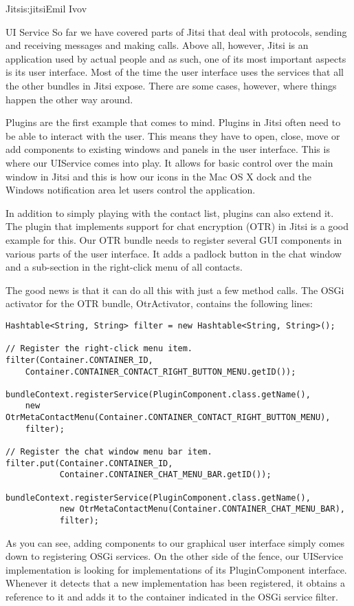 \begin{aosachapter}{Jitsi}{s:jitsi}{Emil Ivov}
\begin{aosasect1}{UI Service}
So far we have covered parts of Jitsi that deal with protocols,
sending and receiving messages and making calls. Above all, however,
Jitsi is an application used by actual people and as such, one of its
most important aspects is its user interface. Most of the time the
user interface uses the services that all the other bundles in Jitsi
expose. There are some cases, however, where things happen the other
way around.

Plugins are the first example that comes to mind. Plugins in Jitsi
often need to be able to interact with the user. This means they have
to open, close, move or add components to existing windows and panels
in the user interface. This is where our UIService comes into play. It
allows for basic control over the main window in Jitsi and this is how
our icons in the Mac OS X dock and the Windows notification area let
users control the application.

In addition to simply playing with the contact list, plugins can also
extend it. The plugin that implements support for chat encryption
(OTR) in Jitsi is a good example for this. Our OTR bundle needs to
register several GUI components in various parts of the user
interface. It adds a padlock button in the chat window and a
sub-section in the right-click menu of all contacts.

The good news is that it can do all this with just a few method calls.
The OSGi activator for the OTR bundle, OtrActivator, contains the
following lines:

\begin{verbatim}
Hashtable<String, String> filter = new Hashtable<String, String>();

// Register the right-click menu item.
filter(Container.CONTAINER_ID,
    Container.CONTAINER_CONTACT_RIGHT_BUTTON_MENU.getID());

bundleContext.registerService(PluginComponent.class.getName(),
    new OtrMetaContactMenu(Container.CONTAINER_CONTACT_RIGHT_BUTTON_MENU),
    filter);

// Register the chat window menu bar item.
filter.put(Container.CONTAINER_ID,
           Container.CONTAINER_CHAT_MENU_BAR.getID());

bundleContext.registerService(PluginComponent.class.getName(),
           new OtrMetaContactMenu(Container.CONTAINER_CHAT_MENU_BAR),
           filter);
\end{verbatim}

As you can see, adding components to our graphical user interface
simply comes down to registering OSGi services. On the other side of
the fence, our UIService implementation is looking for implementations
of its PluginComponent interface. Whenever it detects that a new
implementation has been registered, it obtains a reference to it and
adds it to the container indicated in the OSGi service filter.


\end{aosasect1}
\end{aosachapter}
